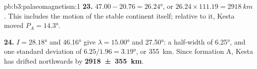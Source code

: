 \begin{solution}{pb:b3:palaeomagnetism:1}
\textbf{23.} $47.00 - 20.76 = \ang{26.24}$, or $26.24\times111.19 =
\qty{2918}{km}$. This includes the motion of the stable continent itself;
relative to it, Kesta moved $P_A = \ang{14.3}$.

\textbf{24.} $I = \ang{28.18}$ and \ang{46.16} give $\lambda = \ang{15.00}$ and
\ang{27.50}: a half-width of \ang{6.25}, and one standard deviation of
$6.25/1.96 = \ang{3.19}$, or \qty{355}{km}. Since formation A, Kesta has drifted
northwards by
\textbf{\qty[text-series-to-math=true]{2918 \pm 355}{km}}.
\end{solution}
